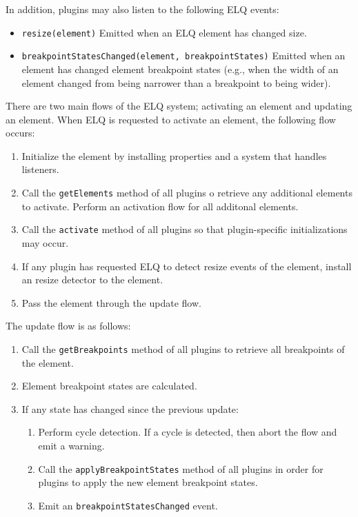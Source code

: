 \documentclass{acm_proc_article-sp}
\newcommand{\code}[1]{\texttt{#1}}
\newcommand{\elq}{ELQ}
\begin{document}
  In addition, plugins may also listen to the following \elq{} events:
  \begin{itemize}
    \item \code{resize(element)}
          Emitted when an \elq{} element has changed size.
    \item \code{breakpointStatesChanged(element, breakpointStates)}
          Emitted when an element has changed element breakpoint states (e.g., when the width of an element changed from being narrower than a breakpoint to being wider).
  \end{itemize}

  There are two main flows of the \elq{} system; activating an element and updating an element.
  When \elq{} is requested to activate an element, the following flow occurs:

  \begin{enumerate}
    \item Initialize the element by installing properties and a system that handles listeners.
    \item 
          Call the \code{getElements} method of all plugins o retrieve any additional elements to activate.
          Perform an activation flow for all additonal elements.
    \item Call the \code{activate} method of all plugins so that plugin-specific initializations may occur.
    \item If any plugin has requested \elq{} to detect resize events of the element, install an resize detector to the element.
    \item Pass the element through the update flow.
  \end{enumerate}

  The update flow is as follows:
  \begin{enumerate}
    \item Call the \code{getBreakpoints} method of all plugins to retrieve all breakpoints of the element.
    \item Element breakpoint states are calculated.
    \item If any state has changed since the previous update:
    \begin{enumerate}
      \item Perform cycle detection. If a cycle is detected, then abort the flow and emit a warning.
      \item Call the \code{applyBreakpointStates} method of all plugins in order for plugins to apply the new element breakpoint states.
      \item Emit an \code{breakpointStatesChanged} event.
    \end{enumerate}
  \end{enumerate}
\end{document}
